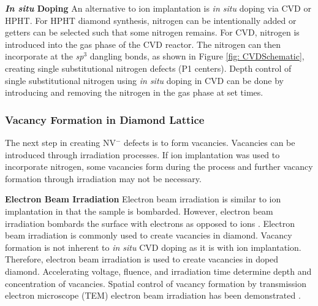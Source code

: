 \noindent\textbf{\textit{In situ} Doping}
    \newline \indent
    An alternative to ion implantation is \textit{in situ} doping via CVD or HPHT. For HPHT diamond synthesis, nitrogen can be intentionally added or getters can be selected such that some nitrogen remains. For CVD, nitrogen is introduced into the gas phase of the CVD reactor. The nitrogen can then incorporate at the \textit{sp$^3$} dangling bonds, as shown in Figure \ref{fig: CVDSchematic}, creating single substitutional nitrogen defects (P1 centers). Depth control of single substitutional nitrogen using \textit{in situ} doping in CVD can be done by introducing and removing the nitrogen in the gas phase at set times. 
	

\subsubsection{Vacancy Formation in Diamond Lattice}
\label{FormVac}
\indent
	The next step in creating NV$^-$ defects is to form vacancies. Vacancies can be introduced through irradiation processes. If ion implantation was used to incorporate nitrogen, some vacancies form during the process and further vacancy formation through irradiation may not be necessary. 
    
\noindent\textbf{Electron Beam Irradiation}
\newline \indent
    Electron beam irradiation is similar to ion implantation in that the sample is bombarded. However, electron beam irradiation bombards the surface with electrons as opposed to ions \cite{Luo2021}. Electron beam irradiation is commonly used to create vacancies in diamond. Vacancy formation is not inherent to \textit{in situ} CVD doping as it is with ion implantation. Therefore, electron beam irradiation is used to create vacancies in doped diamond. Accelerating voltage, fluence, and irradiation time determine depth and concentration of vacancies. Spatial control of vacancy formation by transmission electron microscope (TEM) electron beam irradiation has been demonstrated \cite{McLellan2016PatternedTechnique}.
       
